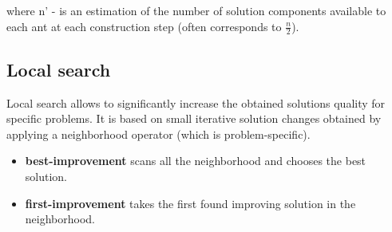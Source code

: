 where n' - is an estimation of the number of solution components available to each ant at each construction step (often corresponds to $\frac{n}{2}$).

\subsection{Local search}
Local search allows to significantly increase the obtained solutions quality for specific problems. It is based on small iterative solution changes obtained by applying a neighborhood operator (which is problem-specific).

\begin{itemize}
\item \textbf{best-improvement} scans all the neighborhood and chooses the best solution.
\item \textbf{first-improvement} takes the first found improving solution in the neighborhood.
\end{itemize}





